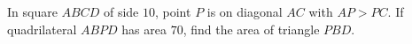 In square $ABCD$ of side $10$, point $P$ is on diagonal $AC$ with $AP>PC$. If quadrilateral $ABPD$ has area $70$, find the area of triangle $PBD$.
